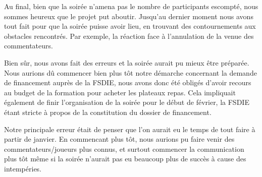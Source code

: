 Au final, bien que la soirée n'amena pas le nombre de participants escompté, nous sommes heureux que le projet put aboutir. 
Jusqu'au dernier moment nous avons tout fait pour que la soirée puisse avoir lieu, en trouvant des contournements aux 
obstacles rencontrés. Par exemple, la réaction face à l'annulation de la venue des commentateurs.

Bien sûr, nous avons fait des erreurs et la soirée aurait pu mieux être préparée. Nous aurions dû commencer bien plus tôt 
notre démarche concernant la demande de financement auprès de la FSDIE, nous avons donc été obligés d'avoir recours au budget 
de la formation pour acheter les plateaux repas. Cela impliquait également de finir l'organisation de la soirée pour le début 
de février, la FSDIE étant stricte à propos de la constitution du dossier de financement.

Notre principale erreur était de penser que l'on aurait eu le temps de tout faire à partir de janvier. En commencant plus tôt,
nous aurions pu faire venir des commentateurs/joueurs plus connus, et surtout commencer la communication plus tôt même si la soirée 
n'aurait pas eu beaucoup plus de succès à cause des intempéries.